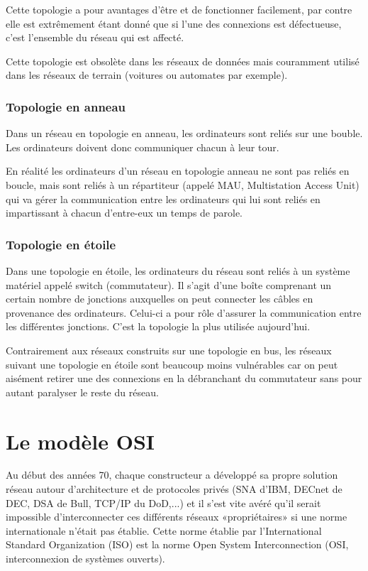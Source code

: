 \documentclass[10pt,fleqn]{article} %
\begin{document}
Cette topologie a pour avantages d'être  et de fonctionner facilement, par contre elle est extrêmement  étant donné que si l'une des connexions est défectueuse, c'est l'ensemble du réseau qui est affecté.

Cette topologie est obsolète dans les réseaux de données mais couramment utilisé dans les réseaux de terrain (voitures ou automates par exemple).

\subsubsection{Topologie en anneau}
Dans un réseau en topologie en anneau, les ordinateurs sont reliés sur une bouble. Les ordinateurs doivent donc communiquer chacun à leur tour.

En réalité les ordinateurs d'un réseau en topologie anneau ne sont pas reliés en boucle, mais sont reliés à un répartiteur (appelé MAU, Multistation Access Unit) qui va gérer la communication entre les ordinateurs qui lui sont reliés en impartissant à chacun d'entre-eux un temps de parole.

\subsubsection{Topologie en étoile}
Dans une topologie en étoile, les ordinateurs du réseau sont reliés à un système matériel appelé switch (commutateur). Il s'agit d'une boîte comprenant un certain nombre de jonctions auxquelles on peut connecter les câbles en provenance des ordinateurs. Celui-ci a pour rôle d'assurer la communication entre les différentes jonctions.
C'est la topologie la plus utilisée aujourd'hui.

Contrairement aux réseaux construits sur une topologie en bus, les réseaux suivant une topologie en étoile sont beaucoup moins vulnérables car on peut aisément retirer une des connexions en la débranchant du commutateur sans pour autant paralyser le reste du réseau.

\section{Le modèle OSI}
Au début des années 70, chaque constructeur a développé sa propre solution réseau autour d'architecture et de protocoles privés (SNA d'IBM, DECnet de DEC, DSA de Bull, TCP/IP du DoD,...) et il s'est vite avéré qu'il serait impossible d'interconnecter ces différents réseaux «propriétaires» si une norme internationale n'était pas établie. Cette norme établie par l'International Standard Organization (ISO) est la norme Open System Interconnection (OSI, interconnexion de systèmes ouverts).
\end{document}
